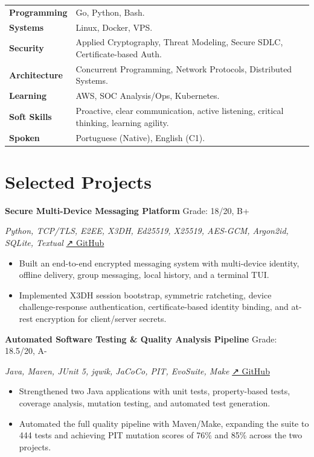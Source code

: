 \documentclass[11pt,a4paper]{article}
\newenvironment{cvitem}[2]{%
  \vspace{0.25em}
  \noindent
  \textbf{\color{heading}#1}%
  \hfill
  {\small\color{muted}#2}%
  \par
}{}
\newcommand{\cvsub}[2]{%
  \noindent
  {\itshape\color{text}#1}%
  \hfill
  {\small\color{muted}#2}%
  \par
}
\newenvironment{cvbullets}{%
  \begin{itemize}[leftmargin=1.2em, itemsep=0em, topsep=0em, parsep=0em]
}{%
  \end{itemize}
}
\begin{document}
\noindent
\begin{tabular}{@{}p{} p{}@{}}
  \textbf{Programming} & Go, Python, Bash. \\
  \textbf{Systems} & Linux, Docker, VPS. \\
  \textbf{Security} & Applied Cryptography, Threat Modeling, Secure SDLC,
    Certificate-based Auth. \\
  \textbf{Architecture} & Concurrent Programming, Network
    Protocols, Distributed Systems. \\
  \textbf{Learning} & AWS, SOC Analysis/Ops, Kubernetes. \\
  \textbf{Soft Skills} & Proactive, clear communication, active listening,
    critical thinking, learning agility. \\
  \textbf{Spoken} & Portuguese (Native), English (C1). \\
\end{tabular}

\section{Selected Projects}

\begin{cvitem}{Secure Multi-Device Messaging Platform}{Grade: 18/20, B+}
\cvsub{Python, TCP/TLS, E2EE, X3DH, Ed25519, X25519, AES-GCM, Argon2id,
  SQLite, Textual}{\href{https://github.com/marcosevegrand}{↗ GitHub}}
\begin{cvbullets}
  \item Built an end-to-end encrypted messaging system with multi-device
    identity, offline delivery, group messaging, local history, and a
    terminal TUI.
  \item Implemented X3DH session bootstrap, symmetric ratcheting, device
    challenge-response authentication, certificate-based identity binding,
    and at-rest encryption for client/server secrets.
\end{cvbullets}
\end{cvitem}

\begin{cvitem}{Automated Software Testing \& Quality Analysis Pipeline}{Grade: 18.5/20, A-}
\cvsub{Java, Maven, JUnit 5, jqwik, JaCoCo, PIT, EvoSuite,
  Make}{\href{https://github.com/marcosevegrand}{↗ GitHub}}
\begin{cvbullets}
  \item Strengthened two Java applications with unit tests, property-based
    tests, coverage analysis, mutation testing, and automated test
    generation.
  \item Automated the full quality pipeline with Maven/Make, expanding the
    suite to 444 tests and achieving PIT mutation scores of 76\% and 85\%
    across the two projects.
\end{cvbullets}
\end{cvitem}
\end{document}
